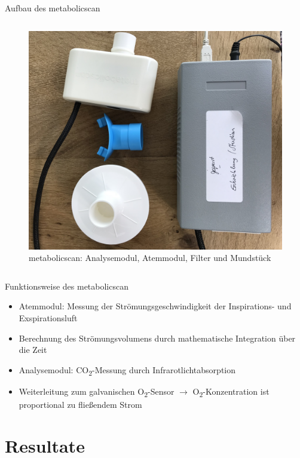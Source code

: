 \documentclass[colorBG,slideColor,8pt]{beamer}
\begin{document}
\begin{frame}{Aufbau des metabolicscan}
\begin{columns}
\begin{column}{0.9\linewidth}
			\begin{figure}[H]
				\centering
				\includegraphics[width=0.6\linewidth]{Bilder/mbs.jpg}
				\caption{metabolicscan: Analysemodul, Atemmodul, Filter und Mundstück}
			\end{figure}
\end{column}
\end{columns}
\end{frame}

\begin{frame}{Funktionsweise des metabolicscan}
	\begin{itemize}
		\item Atemmodul: Messung der Strömungsgeschwindigkeit der Inspirations- und Exspirationsluft
		\item Berechnung des Strömungsvolumens durch mathematische Integration über die Zeit
		\item Analysemodul: CO\textsubscript{2}-Messung durch Infrarotlichtabsorption
		\item Weiterleitung zum galvanischen O\textsubscript{2}-Sensor $\rightarrow$ O\textsubscript{2}-Konzentration ist proportional zu fließendem Strom
	\end{itemize}
\end{frame}

\section{Resultate}
\end{document}
